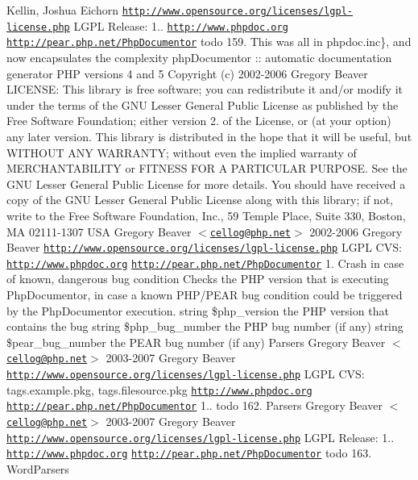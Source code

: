 {{{\-Kellin, \-Joshua \-Eichorn  \href{http://www.opensource.org/licenses/lgpl-license.php}{\tt http\-://www.\-opensource.\-org/licenses/lgpl-\/license.\-php} \-L\-G\-P\-L  \-Release\-: 1..  \href{http://www.phpdoc.org}{\tt http\-://www.\-phpdoc.\-org}  \href{http://pear.php.net/PhpDocumentor}{\tt http\-://pear.\-php.\-net/\-Php\-Documentor}  todo 159.  \-This was all in  phpdoc.\-inc\}, and now encapsulates the complexity  php\-Documentor \-:\-: automatic documentation generator  \-P\-H\-P versions 4 and 5  \-Copyright (c) 2002-\/2006 \-Gregory \-Beaver  \-L\-I\-C\-E\-N\-S\-E\-:  \-This library is free software; you can redistribute it and/or modify it under the terms of the \-G\-N\-U \-Lesser \-General \-Public \-License as published by the \-Free \-Software \-Foundation; either version 2. of the \-License, or (at your option) any later version.  \-This library is distributed in the hope that it will be useful, but \-W\-I\-T\-H\-O\-U\-T \-A\-N\-Y \-W\-A\-R\-R\-A\-N\-T\-Y; without even the implied warranty of \-M\-E\-R\-C\-H\-A\-N\-T\-A\-B\-I\-L\-I\-T\-Y or \-F\-I\-T\-N\-E\-S\-S \-F\-O\-R \-A \-P\-A\-R\-T\-I\-C\-U\-L\-A\-R \-P\-U\-R\-P\-O\-S\-E. \-See the \-G\-N\-U \-Lesser \-General \-Public \-License for more details.  \-You should have received a copy of the \-G\-N\-U \-Lesser \-General \-Public \-License along with this library; if not, write to the \-Free \-Software \-Foundation, \-Inc., 59 \-Temple \-Place, \-Suite 330, \-Boston, \-M\-A 02111-\/1307 \-U\-S\-A   \-Gregory \-Beaver $<$\href{mailto:cellog@php.net}{\tt cellog@php.\-net}$>$  2002-\/2006 \-Gregory \-Beaver  \href{http://www.opensource.org/licenses/lgpl-license.php}{\tt http\-://www.\-opensource.\-org/licenses/lgpl-\/license.\-php} \-L\-G\-P\-L  \-C\-V\-S\-:   \href{http://www.phpdoc.org}{\tt http\-://www.\-phpdoc.\-org}  \href{http://pear.php.net/PhpDocumentor}{\tt http\-://pear.\-php.\-net/\-Php\-Documentor}  1.  \-Crash in case of known, dangerous bug condition  \-Checks the \-P\-H\-P version that is executing \-Php\-Documentor, in case a known \-P\-H\-P/\-P\-E\-A\-R bug condition could be triggered by the \-Php\-Documentor execution.  string \$php\-\_\-version the \-P\-H\-P version that contains the bug  string \$php\-\_\-bug\-\_\-number the \-P\-H\-P bug number (if any)  string \$pear\-\_\-bug\-\_\-number the \-P\-E\-A\-R bug number (if any)   \-Parsers  \-Gregory \-Beaver $<$\href{mailto:cellog@php.net}{\tt cellog@php.\-net}$>$  2003-\/2007 \-Gregory \-Beaver  \href{http://www.opensource.org/licenses/lgpl-license.php}{\tt http\-://www.\-opensource.\-org/licenses/lgpl-\/license.\-php} \-L\-G\-P\-L  \-C\-V\-S\-:   tags.\-example.\-pkg, tags.\-filesource.\-pkg  \href{http://www.phpdoc.org}{\tt http\-://www.\-phpdoc.\-org}  \href{http://pear.php.net/PhpDocumentor}{\tt http\-://pear.\-php.\-net/\-Php\-Documentor}  1..  todo 162.   \-Parsers  \-Gregory \-Beaver $<$\href{mailto:cellog@php.net}{\tt cellog@php.\-net}$>$  2003-\/2007 \-Gregory \-Beaver  \href{http://www.opensource.org/licenses/lgpl-license.php}{\tt http\-://www.\-opensource.\-org/licenses/lgpl-\/license.\-php} \-L\-G\-P\-L  \-Release\-: 1..  \href{http://www.phpdoc.org}{\tt http\-://www.\-phpdoc.\-org}  \href{http://pear.php.net/PhpDocumentor}{\tt http\-://pear.\-php.\-net/\-Php\-Documentor}  todo 163.   \-Word\-Parsers  }}}
